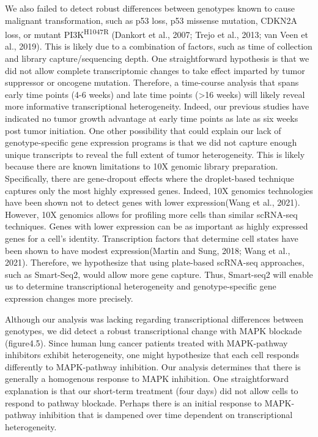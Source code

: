 We also failed to detect robust differences between genotypes known to cause malignant transformation, such as p53 loss, p53 missense mutation, CDKN2A loss, or mutant PI3K\textsuperscript{H1047R} (Dankort et al., 2007; Trejo et al., 2013; van Veen et al., 2019). This is likely due to a combination of factors, such as time of collection and library capture/sequencing depth. One straightforward hypothesis is that we did not allow complete transcriptomic changes to take effect imparted by tumor suppressor or oncogene mutation. Therefore, a time-course analysis that spans early time points (4-6 weeks) and late time points (\textgreater16 weeks) will likely reveal more informative transcriptional heterogeneity. Indeed, our previous studies have indicated no tumor growth advantage at early time points as late as six weeks post tumor initiation. One other possibility that could explain our lack of genotype-specific gene expression programs is that we did not capture enough unique transcripts to reveal the full extent of tumor heterogeneity. This is likely because there are known limitations to 10X genomic library preparation. Specifically, there are gene-dropout effects where the droplet-based technique captures only the most highly expressed genes. Indeed, 10X genomics technologies have been shown not to detect genes with lower expression(Wang et al., 2021). However, 10X genomics allows for profiling more cells than similar scRNA-seq techniques. Genes with lower expression can be as important as highly expressed genes for a cell's identity. Transcription factors that determine cell states have been shown to have modest expression(Martin and Sung, 2018; Wang et al., 2021).
Therefore, we hypothesize that using plate-based scRNA-seq approaches, such as Smart-Seq2, would allow more gene capture. Thus, Smart-seq2 will enable us to determine transcriptional heterogeneity and genotype-specific gene expression changes more precisely.

Although our analysis was lacking regarding transcriptional differences between genotypes, we did detect a robust transcriptional change with MAPK blockade (figure4.5). Since human lung cancer patients treated with MAPK-pathway inhibitors exhibit heterogeneity, one might hypothesize that each cell responds differently to MAPK-pathway inhibition. Our analysis determines that there is generally a homogenous response to MAPK inhibition. One straightforward explanation is that our short-term treatment (four days) did not allow cells to respond to pathway blockade. Perhaps there is an initial response to MAPK-pathway inhibition that is dampened over time dependent on transcriptional heterogeneity.


